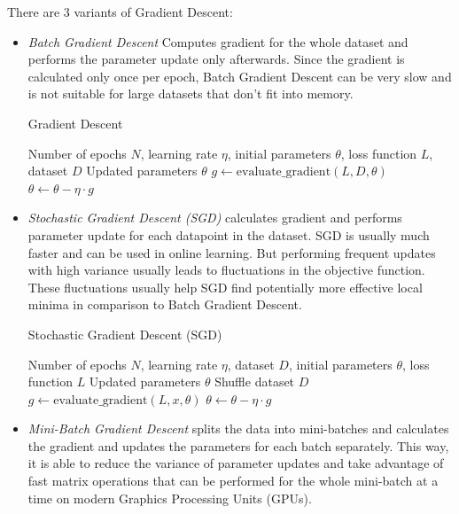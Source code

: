 There are 3 variants of Gradient Descent: \autocite{ruder2017overviewgradientdescentoptimization}
\begin{itemize}
  \item \textit{Batch Gradient Descent} Computes gradient for the whole dataset and performs the parameter update only afterwards. Since the gradient is calculated only once per epoch, Batch Gradient Descent can be very slow and is not suitable for large datasets that don't fit into memory.
    \begin{algorithm}
      \caption{Gradient Descent}
      \begin{algorithmic}[1]
        \Require Number of epochs $N$, learning rate $\eta$, initial parameters $\theta$, loss function $L$, dataset $D$
        \Ensure Updated parameters $\theta$
        \State $g \gets \text{evaluate\_gradient}(L, D, \theta)$
        \State $\theta \gets \theta - \eta \cdot g$
        \EndFor
      \end{algorithmic}
    \end{algorithm}
  \item \textit{Stochastic Gradient Descent (SGD)} calculates gradient and performs parameter update for each datapoint in the dataset. SGD is usually much faster and can be used in online learning. But performing frequent updates with high variance usually leads to fluctuations in the objective function. These fluctuations usually help SGD find potentially more effective local minima in comparison to Batch Gradient Descent.
    \begin{algorithm}
      \caption{Stochastic Gradient Descent (SGD)}
      \begin{algorithmic}[1]
        \Require Number of epochs $N$, learning rate $\eta$, dataset $D$, initial parameters $\theta$, loss function $L$
        \Ensure Updated parameters $\theta$
        \State Shuffle dataset $D$
        \State $g \gets \text{evaluate\_gradient}(L, x, \theta)$
        \State $\theta \gets \theta - \eta \cdot g$
        \EndFor
        \EndFor
      \end{algorithmic}
    \end{algorithm}
  \item \textit{Mini-Batch Gradient Descent} splits the data into mini-batches and calculates the gradient and updates the parameters for each batch separately. This way, it is able to reduce the variance of parameter updates and take advantage of fast matrix operations that can be performed for the whole mini-batch at a time on modern Graphics Processing Units (GPUs).

\end{itemize}
